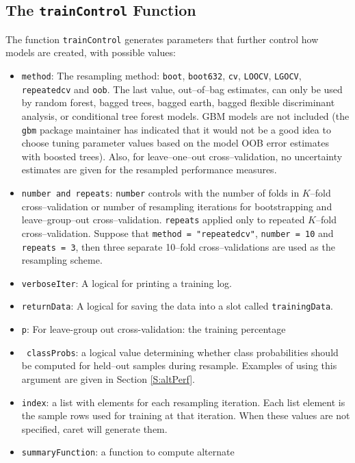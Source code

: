 \documentclass[12pt]{article}
\newcommand{\code}[1]{\mbox{\footnotesize\color{darkblue}\texttt{#1}}}
\newcommand{\pkg}[1]{{\fontseries{b}\selectfont #1}}
\renewcommand{\pkg}[1]{{\textsf{#1}}}
\begin{document}
\subsection{The \code{trainControl} Function}\label{S:control}

The function \code{trainControl} generates parameters that further
control how models are created, with possible values: 
\begin{itemize}
\item \code{method}: The resampling method: \code{boot}, \code{boot632},
  \code{cv}, \code{LOOCV}, \code{LGOCV}, \code{repeatedcv}  and \code{oob}. The
  last value, out--of--bag estimates, can only be used by random
  forest, bagged trees, bagged earth, bagged flexible discriminant
  analysis, or conditional tree forest models. GBM models are not
  included (the \texttt{gbm} package maintainer has indicated that
  it would not be a good idea to choose tuning parameter values
  based on the model OOB error estimates with boosted trees). Also,
  for leave--one--out cross--validation, no uncertainty estimates
  are given for the resampled performance measures. 
\item \code{number and repeats}: \code{number} controls with the 
  number of folds in $K$--fold cross--validation or number of
  resampling iterations for bootstrapping and leave--group--out
  cross--validation. \code{repeats} applied only to repeated  
  $K$--fold cross--validation. Suppose that \code{method = "repeatedcv"}, 
  \code{number = 10} and \code{repeats = 3}, then three separate
  10--fold cross--validations are used as the resampling scheme.
\item \code{verboseIter}: A logical for printing a training log.
\item \code{returnData}: A logical for saving the data into a slot
  called \code{trainingData}. 
\item \code{p}: For leave-group out cross-validation: the training
  percentage 
\item \code{ classProbs}: a logical value determining whether
  class probabilities should be computed for held--out samples
  during resample. Examples of using this argument are given in
  Section \ref{S:altPerf}. 
\item \code{index}: a list with elements for each resampling
  iteration. Each list element is the sample rows used for training
  at that iteration. When these values are not specified,
  \pkg{caret} will generate them. 
\item \code{summaryFunction}: a function to compute alternate

\end{itemize}
\end{document}
